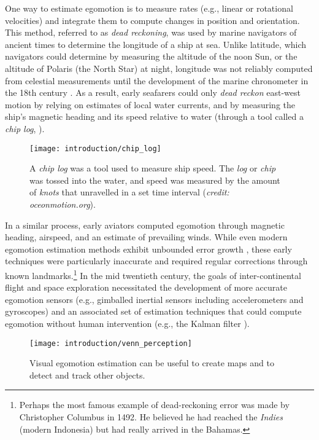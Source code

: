 One way to estimate egomotion is to measure rates (e.g., linear or rotational velocities) and integrate them to compute changes in position and orientation. This method, referred to as \textit{dead reckoning}, was used by marine navigators of ancient times to determine the longitude of a ship at sea. Unlike latitude, which navigators could determine by measuring the altitude of the noon Sun, or the altitude of Polaris (the North Star) at night, longitude was not reliably computed from celestial measurements until the development of the marine chronometer in the 18th century \citep{Barfoot2017-ri}. As a result, early seafarers could only \textit{dead reckon} east-west motion by relying on estimates of local water currents, and by measuring the ship's magnetic heading and its speed relative to water (through a tool called a \textit{chip log}, ). 

\begin{wrapfigure}{r}{0.45\textwidth}
	\centering
	\texttt{[image: introduction/chip\_log]}
	\caption{A \textit{chip log} was a tool used to measure ship speed. The \textit{log} or \textit{chip} was tossed into the water, and speed was measured by the amount of \textit{knots} that unravelled in a set time interval (\textit{credit: oceonmotion.org}).}
	\label{fig:intro_chip_log}
	\vspace{-1em}
\end{wrapfigure}


In a similar process, early aviators computed egomotion through magnetic heading, airspeed, and an estimate of prevailing winds. While even modern egomotion estimation methods exhibit unbounded error growth \citep{Olson2003-ax}, these early techniques were particularly inaccurate and required regular corrections through known landmarks.\footnote{Perhaps the most famous example of dead-reckoning error was made by Christopher Columbus in 1492. He believed he had reached the \textit{Indies} (modern Indonesia) but had really arrived in the Bahamas.} In the mid twentieth century, the goals of inter-continental flight and space exploration necessitated the development of more accurate egomotion sensors (e.g., gimballed inertial sensors including accelerometers and gyroscopes) and an associated set of estimation techniques that could compute egomotion without human intervention (e.g., the Kalman filter \citep{Grewal2010-ts}).

\begin{wrapfigure}{r}{0.5\textwidth}
	\centering
	\texttt{[image: introduction/venn\_perception]}
	\caption{Visual egomotion estimation can be useful to create maps and to detect and track other objects.}
	\label{fig:intro_state_venn}
	\vspace{-1.5em}
\end{wrapfigure}

